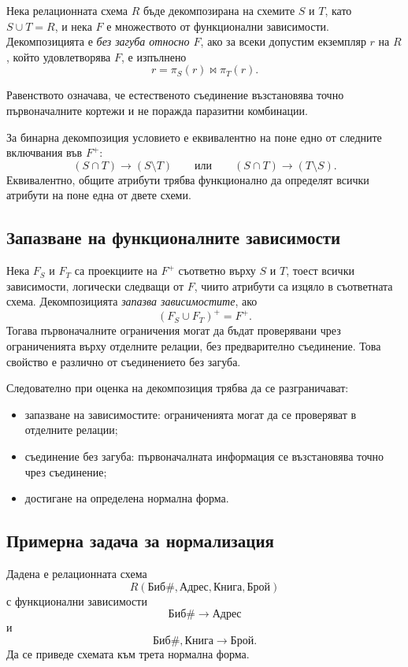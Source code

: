\begin{defn}
Нека релационната схема $R$ бъде декомпозирана на схемите $S$ и $T$, като $S\cup T=R$, и нека $F$ е множеството от функционални зависимости. Декомпозицията е \emph{без загуба относно $F$}, ако за всеки допустим екземпляр $r$ на $R$, който удовлетворява $F$, е изпълнено
\[
r=\pi_S(r)\bowtie\pi_T(r).
\]
\end{defn}
Равенството означава, че естественото съединение възстановява точно първоначалните кортежи и не поражда паразитни комбинации.

За бинарна декомпозиция условието е еквивалентно на поне едно от следните включвания във $F^+$:
\[
(S\cap T)\to(S\setminus T)
\qquad\text{или}\qquad
(S\cap T)\to(T\setminus S).
\]
Еквивалентно, общите атрибути трябва функционално да определят всички атрибути на поне една от двете схеми.

\subsection{Запазване на функционалните зависимости}\label{s:24.1.14}

Нека $F_S$ и $F_T$ са проекциите на $F^+$ съответно върху $S$ и $T$, тоест всички зависимости, логически следващи от $F$, чиито атрибути са изцяло в съответната схема. Декомпозицията \emph{запазва зависимостите}, ако
\[
(F_S\cup F_T)^+=F^+.
\]
Тогава първоначалните ограничения могат да бъдат проверявани чрез ограниченията върху отделните релации, без предварително съединение. Това свойство е различно от съединението без загуба.

Следователно при оценка на декомпозиция трябва да се разграничават:

\begin{itemize}
    \item запазване на зависимостите: ограниченията могат да се проверяват в отделните релации;
    \item съединение без загуба: първоначалната информация се възстановява точно чрез съединение;
    \item достигане на определена нормална форма.
\end{itemize}

\subsection{Примерна задача за нормализация}\label{s:24.1.15}

\begin{example}
Дадена е релационната схема
\[
R(\mathrm{Биб\#},\mathrm{Адрес},\mathrm{Книга},\mathrm{Брой})
\]
с функционални зависимости
\[
\mathrm{Биб\#}\to\mathrm{Адрес}
\]
и
\[
\mathrm{Биб\#},\mathrm{Книга}\to\mathrm{Брой}.
\]
Да се приведе схемата към трета нормална форма.
\end{example}

